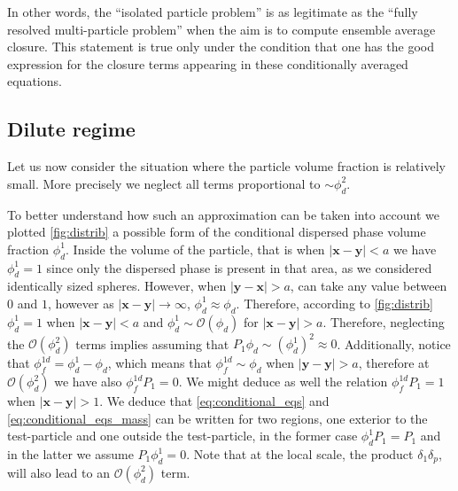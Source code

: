 In other words, the ``isolated particle problem'' is as legitimate as the ``fully resolved multi-particle problem'' when the aim is to compute ensemble average closure.
This statement is true only under the condition that one has the good expression for the closure terms appearing in these conditionally averaged equations. 

\subsection{Dilute regime}
Let us now consider the situation where the particle volume fraction is relatively small. 
More precisely we neglect all terms proportional to $\sim \phi_d^2$. 

To better understand how such an approximation can be taken into account we plotted \ref{fig:distrib} a possible form of the conditional dispersed phase volume fraction $\phi_d^1$.
Inside the volume of the particle, that is when $|\textbf{x}-\textbf{y}| < a$ we have $\phi_d^1 = 1$ since only the dispersed phase is present in that area, as we considered identically sized spheres. 
However, when $|\textbf{y} - \textbf{x}| >a$, can take any value between $0$ and $1$, however as $|\textbf{x}- \textbf{y}|\to\infty$, $\phi_d^1 \approx \phi_d$.
Therefore, according to \ref{fig:distrib} $\phi_d^1 = 1$ when $|\textbf{x}-\textbf{y}| < a$  and $\phi_d^1 \sim \mathcal{O}(\phi_d)$ for $|\textbf{x}-\textbf{y}| > a$. 
Therefore, neglecting the $\mathcal{O}(\phi_d^2)$ terms  implies assuming that $P_1 \phi_d \sim (\phi_d^1)^2 \approx 0$. 
Additionally, notice that $\phi_f^{1d} = \phi_d^1 - \phi_d$, which means that $\phi_f^{1d} \sim \phi_d$ when $|\textbf{y} -\textbf{y}| > a$, therefore at  $\mathcal{O}(\phi_d^2)$ we have also $\phi_f^{1d} P_1= 0$.
We might deduce as well the relation $\phi_f^{1d} P_1 = 1$ when $|\textbf{x}-\textbf{y}| >1$. 
We deduce that \ref{eq:conditional_eqs} and \ref{eq:conditional_eqs_mass} can be written for two regions, one exterior to the test-particle and one outside the test-particle, in the former case $\phi_d^1P_1  = P_1$ and in the latter we assume $P_1 \phi_d^1 = 0$. 
Note that at the local scale, the product $\delta_1\delta_p$, will also lead to an $\mathcal{O}(\phi_d^2)$ term.  

